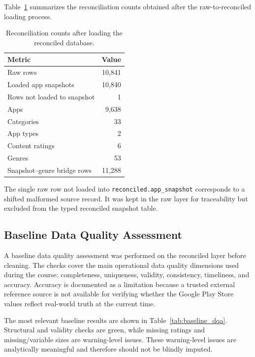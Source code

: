 \documentclass[11pt,a4paper]{article}
\begin{document}
Table~\ref{tab:phase2_reconciliation_counts} summarizes the reconciliation counts obtained after the raw-to-reconciled loading process.

\begin{table}[H]
\centering
\caption{Reconciliation counts after loading the reconciled database.}
\label{tab:phase2_reconciliation_counts}
\begin{tabular}{@{}lr@{}}
\toprule
\textbf{Metric} & \textbf{Value} \\
\midrule
Raw rows & 10,841 \\
Loaded app snapshots & 10,840 \\
Rows not loaded to snapshot & 1 \\
Apps & 9,638 \\
Categories & 33 \\
App types & 2 \\
Content ratings & 6 \\
Genres & 53 \\
Snapshot--genre bridge rows & 11,288 \\
\bottomrule
\end{tabular}
\end{table}

The single raw row not loaded into \texttt{reconciled.app\_snapshot} corresponds to a shifted malformed source record. It was kept in the raw layer for traceability but excluded from the typed reconciled snapshot table.

\subsection{Baseline Data Quality Assessment}
A baseline data quality assessment was performed on the reconciled layer before cleaning. The checks cover the main operational data quality dimensions used during the course: completeness, uniqueness, validity, consistency, timeliness, and accuracy. Accuracy is documented as a limitation because a trusted external reference source is not available for verifying whether the Google Play Store values reflect real-world truth at the current time.

The most relevant baseline results are shown in Table~\ref{tab:baseline_dqa}. Structural and validity checks are green, while missing ratings and missing/variable sizes are warning-level issues. These warning-level issues are analytically meaningful and therefore should not be blindly imputed.
\end{document}
